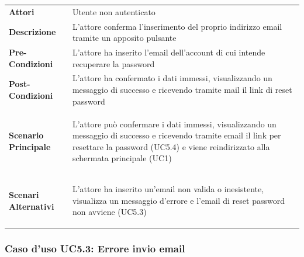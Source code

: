 \begin{minipage}{\linewidth}
\begin{longtable}{ l | p{11cm}}
	\hline
	\rowcolor{Gray}
	 \multicolumn{2}{c}{UC5.2 - Conferma inserimento email} \\
	 \hline
	\textbf{Attori} & Utente non autenticato \\
	\textbf{Descrizione} & L'attore conferma l'inserimento del proprio indirizzo email tramite un apposito pulsante \\
	\textbf{Pre-Condizioni} & L'attore ha inserito l'email dell'account di cui intende recuperare la password \\
	\textbf{Post-Condizioni} & L'attore ha confermato i dati immessi, visualizzando un messaggio di successo e ricevendo tramite mail il link di reset password \\
	\textbf{Scenario Principale} & \begin{enumerate*}[label=(\arabic*.),itemjoin={\newline}]
		\item L'attore può confermare i dati immessi, visualizzando un messaggio di successo e ricevendo tramite email il link per resettare la password (UC5.4) e viene reindirizzato alla schermata principale (UC1)
	\end{enumerate*}\\
	\textbf{Scenari Alternativi} & 
	\begin{enumerate*}[label=(\arabic*.),itemjoin={\newline}]
		\item L'attore ha inserito un'email non valida o inesistente, visualizza un messaggio d'errore e l'email di reset password non avviene (UC5.3)
	\end{enumerate*}\\
\end{longtable}
\end{minipage}

\subsubsection{Caso d'uso UC5.3: Errore invio email}
\label{UC5_3}

